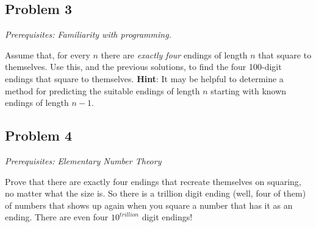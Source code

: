 \documentclass[11pt, oneside]{article} 	%
\begin{document}
\subsection{Problem 3} 

\emph{Prerequisites: Familiarity with programming.}

Assume that, for every $n$ there are \emph{exactly four} endings of length $n$ that square to themselves.  Use this, and the previous solutions, to find the four 100-digit endings that square to themselves.  \textbf{Hint}: It may be helpful to determine a method for predicting the suitable endings of length $n$ starting with known endings of length $n-1$.

\subsection{Problem 4}

\emph{Prerequisites: Elementary Number Theory}

Prove that there are exactly four endings that recreate themselves on squaring, no matter what the size is.  So there is a trillion digit ending (well, four of them) of numbers that shows up again when you square a number that has it as an ending.  There are even four $10^{trillion}$ digit endings!  
\end{document}
